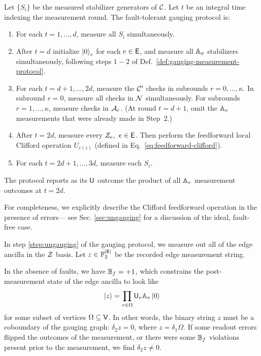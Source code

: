 \documentclass[11pt]{article}
\begin{document}
\begin{definition}\label{def:detailed-gauging-procedure}
Let $\{S_i\}$ be the measured stabilizer generators of $\mathcal{C}$.
Let $t$ be an integral time indexing the measurement round. 
The fault-tolerant gauging protocol is:
\begin{enumerate}
    \item For each $t=1,\dots,d$, measure all $S_i$ simultaneously.
    \item\label{step:gauging} After $t=d$ initialize $\ket{0}_e$ for each $e\in \mathsf{E}$, and measure all $\mathbb{A}_v$ stabilizers simultaneously, following steps $1-2$ of Def.~\ref{def:gauging-measurement-protocol}.
    \item For each $t=d+1,\dots, 2d$, measure the $\mathcal{C}'$ checks in subrounds $r=0,\dots ,\kappa$. In subround $r=0$, measure all checks in $\mathcal{N}$ simultaneously. For subrounds $r=1,\dots,\kappa$, measure checks in $\mathcal{A}_r$. (At round $t=d+1$, omit the $\mathbb{A}_v$ measurements that were already made in Step~2.)
    \item \label{step:ungauging} After $t=2d$, measure every $\mathcal{Z}_e,\ e\in \mathsf{E}$. 
    Then perform the feedforward local Clifford operation $U_{c(z)}$ (defined in Eq.~\eqref{eq:feedforward-clifford}).
    \item For each $t=2d+1,\dots,3d$,  measure each $S_i$.
\end{enumerate}
The protocol reports as its $\mathsf{U}$ outcome the product of all $\mathbb{A}_v$ measurement outcomes at $t=2d$.
\end{definition}

For completeness, we explicitly describe the Clifford feedforward operation in the presence of errors--- see Sec. \ref{sec:ungauging} for a discussion of the ideal, fault-free case. 

In step \ref{step:ungauging} of the gauging protocol, we measure out all of the edge ancilla in the $\mathcal{Z}$ basis. Let $z\in \mathbb{F}_2^{|\mathsf{E}|}$ be the recorded edge measurement string.

In the absence of faults, we have $\mathbb{B}_f = +1$, which constrains the post-measurement state of the edge ancilla to look like $$\ket{z} = \prod_{v \in \Omega} \mathsf{U}_v \mathbb{A}_v \ket{0}$$ 
for some subset of vertices $\Omega \subseteq \mathsf{V}$. 
In other words, the binary string $z$ must be a coboundary of the gauging graph: $\delta_2 z = 0$, where $z = \delta_1 \Omega$.
If some readout errors flipped the outcomes of the measurement, or there were some $\mathbb{B}_f$ violations present prior to the measurement, we find $\delta_2 z \neq 0$. 
\end{document}
